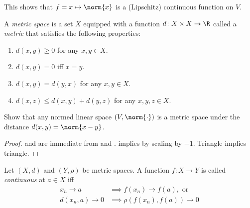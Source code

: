 This shows that $f = x \mapsto \norm{x}$ is a (Lipschitz) continuous
function on $V$.

\begin{definition} \label{def:metric}
    A \emph{metric space} is a set $X$ equipped with a function
    $d\colon X \times X \to \R$ called a \emph{metric} that satisfies
    the following properties:
    \begin{enumerate}[label=\small(M\arabic*)]
        \item $d(x, y) \ge 0$ for any $x, y \in X$.
            \label{def:metric:pos}
        \item $d(x, y) = 0$ iff $x = y$.
            \label{def:metric:def}
        \item $d(x, y) = d(y, x)$ for any $x, y \in X$.
            \label{def:metric:sym}
        \item $d(x, z) \le d(x, y) + d(y, z)$ for any $x, y, z \in X$.
            \label{def:metric:tri}
    \end{enumerate}
\end{definition}

\begin{exercise}[self]
    Show that any normed linear space $(V, \norm{\cdot})$ is a metric space
    under the distance $d(x, y) = \norm{x - y}$.
\end{exercise}
\begin{proof}
     and  are immediate
    from  and .
     implies  by
    scaling by $-1$.
    Triangle implies triangle.
\end{proof}

\begin{definition}[continuity] \label{def:continuity}
    Let $(X, d)$ and $(Y, \rho)$ be metric spaces.
    A function $f\colon X \to Y$ is called \emph{continuous} at $a \in X$
    iff \begin{align*}
        x_n \to a &\implies f(x_n) \to f(a), \text{ or} \\
        d(x_n, a) \to 0 &\implies \rho(f(x_n), f(a)) \to 0
    \end{align*}
\end{definition}

